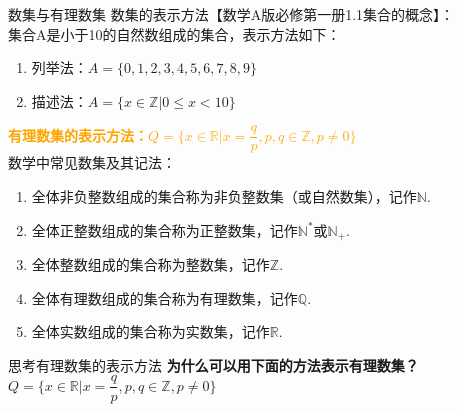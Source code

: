 \documentclass[aspectratio=169]{ctexbeamer} %
\begin{document}
\begin{frame}{数集与有理数集}
数集的表示方法【数学A版必修第一册1.1集合的概念】：\\
集合A是小于10的自然数组成的集合，表示方法如下：\\
\begin{enumerate}[label={\arabic*.}]
\item 列举法：$A = \{0, 1, 2, 3, 4, 5, 6, 7, 8, 9\}$
\item 描述法：$A = \{x \in \mathbb{Z} | 0 \leq x < 10\}$
\end{enumerate}
\textbf{\textcolor{orange}{有理数集的表示方法：$Q = \{ x \in \mathbb{R} | x = \dfrac{q}{p}, p,q \in \mathbb{Z}, p \neq 0\} $ }}\\
数学中常见数集及其记法：
\begin{enumerate}[itemsep=6pt,label={\arabic*.}]
\item 全体非负整数组成的集合称为非负整数集（或自然数集），记作$\mathbb{N}$.
\item 全体正整数组成的集合称为正整数集，记作$\mathbb{N}^*$或$\mathbb{N}_+$.
\item 全体整数组成的集合称为整数集，记作$\mathbb{Z}$.
\item 全体有理数组成的集合称为有理数集，记作$\mathbb{Q}$.
\item 全体实数组成的集合称为实数集，记作$\mathbb{R}$.
\end{enumerate}

\end{frame}

\begin{frame}{思考有理数集的表示方法}
\textbf{为什么可以用下面的方法表示有理数集？ }\\
\vspace{12pt}
$Q = \{ x \in \mathbb{R} | x = \dfrac{q}{p}, p,q \in \mathbb{Z}, p \neq 0\} $
\vspace{5cm}

\end{frame}
\end{document}
